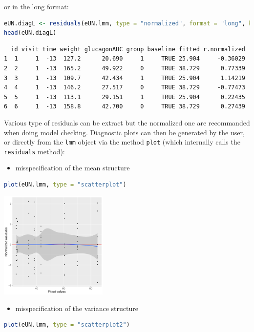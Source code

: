 \documentclass[12pt]{article}
\begin{document}
or in the long format:
\begin{lstlisting}[language=r,numbers=none]
eUN.diagL <- residuals(eUN.lmm, type = "normalized", format = "long", keep.data = TRUE)
head(eUN.diagL)
\end{lstlisting}

\label{}
\begin{verbatim}
  id visit time weight glucagonAUC group baseline fitted r.normalized
1  1     1  -13  127.2      20.690     1     TRUE 25.904     -0.36029
2  2     1  -13  165.2      49.922     0     TRUE 38.729      0.77339
3  3     1  -13  109.7      42.434     1     TRUE 25.904      1.14219
4  4     1  -13  146.2      27.517     0     TRUE 38.729     -0.77473
5  5     1  -13  113.1      29.151     1     TRUE 25.904      0.22435
6  6     1  -13  158.8      42.700     0     TRUE 38.729      0.27439
\end{verbatim}


Various type of residuals can be extract but the normalized one are
recommanded when doing model checking. Diagnostic plots can then be
generated by the user, or directly from the \texttt{lmm} object via the
method \texttt{plot} (which internally calls the \texttt{residuals} method):
\begin{itemize}
\item misspecification of the mean structure
\end{itemize}
\begin{lstlisting}[language=r,numbers=none]
plot(eUN.lmm, type = "scatterplot")
\end{lstlisting}

\begin{center}
\includegraphics[width=0.4\textwidth]{./figures/diag-scatterplot.pdf}
\end{center}

\clearpage

\begin{itemize}
\item misspecification of the variance structure
\end{itemize}
\begin{lstlisting}[language=r,numbers=none]
plot(eUN.lmm, type = "scatterplot2")
\end{lstlisting}
\end{document}
